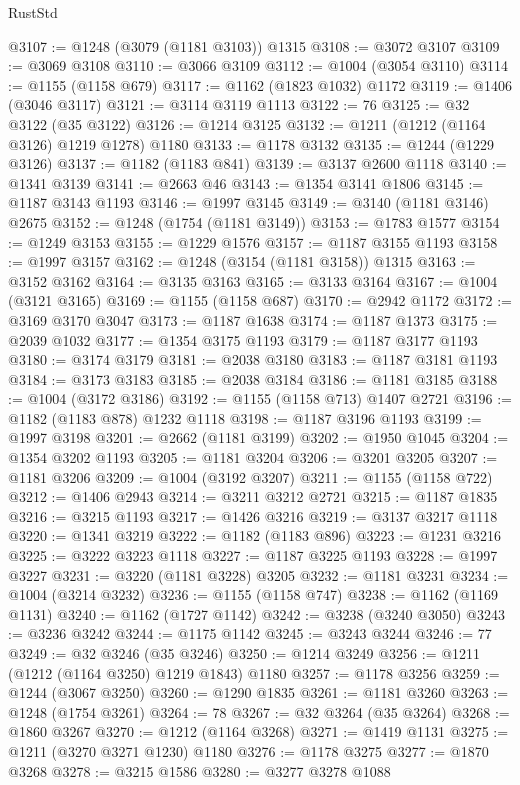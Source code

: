\begin{lexlean}{RustStd}
\begin{coremodule}
@3107 := @1248 (@3079 (@1181 @3103)) @1315
@3108 := @3072 @3107
@3109 := @3069 @3108
@3110 := @3066 @3109
@3112 := @1004 (@3054 @3110)
@3114 := @1155 (@1158 @679)
@3117 := @1162 (@1823 @1032) @1172
@3119 := @1406 (@3046 @3117)
@3121 := @3114 @3119 @1113
@3122 := 76
@3125 := @32 @3122 (@35 @3122)
@3126 := @1214 @3125
@3132 := @1211 (@1212 (@1164 @3126) @1219 @1278) @1180
@3133 := @1178 @3132
@3135 := @1244 (@1229 @3126)
@3137 := @1182 (@1183 @841)
@3139 := @3137 @2600 @1118
@3140 := @1341 @3139
@3141 := @2663 @46
@3143 := @1354 @3141 @1806
@3145 := @1187 @3143 @1193
@3146 := @1997 @3145
@3149 := @3140 (@1181 @3146) @2675
@3152 := @1248 (@1754 (@1181 @3149))
@3153 := @1783 @1577
@3154 := @1249 @3153
@3155 := @1229 @1576
@3157 := @1187 @3155 @1193
@3158 := @1997 @3157
@3162 := @1248 (@3154 (@1181 @3158)) @1315
@3163 := @3152 @3162
@3164 := @3135 @3163
@3165 := @3133 @3164
@3167 := @1004 (@3121 @3165)
@3169 := @1155 (@1158 @687)
@3170 := @2942 @1172
@3172 := @3169 @3170 @3047
@3173 := @1187 @1638
@3174 := @1187 @1373
@3175 := @2039 @1032
@3177 := @1354 @3175 @1193
@3179 := @1187 @3177 @1193
@3180 := @3174 @3179
@3181 := @2038 @3180
@3183 := @1187 @3181 @1193
@3184 := @3173 @3183
@3185 := @2038 @3184
@3186 := @1181 @3185
@3188 := @1004 (@3172 @3186)
@3192 := @1155 (@1158 @713) @1407 @2721
@3196 := @1182 (@1183 @878) @1232 @1118
@3198 := @1187 @3196 @1193
@3199 := @1997 @3198
@3201 := @2662 (@1181 @3199)
@3202 := @1950 @1045
@3204 := @1354 @3202 @1193
@3205 := @1181 @3204
@3206 := @3201 @3205
@3207 := @1181 @3206
@3209 := @1004 (@3192 @3207)
@3211 := @1155 (@1158 @722)
@3212 := @1406 @2943
@3214 := @3211 @3212 @2721
@3215 := @1187 @1835
@3216 := @3215 @1193
@3217 := @1426 @3216
@3219 := @3137 @3217 @1118
@3220 := @1341 @3219
@3222 := @1182 (@1183 @896)
@3223 := @1231 @3216
@3225 := @3222 @3223 @1118
@3227 := @1187 @3225 @1193
@3228 := @1997 @3227
@3231 := @3220 (@1181 @3228) @3205
@3232 := @1181 @3231
@3234 := @1004 (@3214 @3232)
@3236 := @1155 (@1158 @747)
@3238 := @1162 (@1169 @1131)
@3240 := @1162 (@1727 @1142)
@3242 := @3238 (@3240 @3050)
@3243 := @3236 @3242
@3244 := @1175 @1142
@3245 := @3243 @3244
@3246 := 77
@3249 := @32 @3246 (@35 @3246)
@3250 := @1214 @3249
@3256 := @1211 (@1212 (@1164 @3250) @1219 @1843) @1180
@3257 := @1178 @3256
@3259 := @1244 (@3067 @3250)
@3260 := @1290 @1835
@3261 := @1181 @3260
@3263 := @1248 (@1754 @3261)
@3264 := 78
@3267 := @32 @3264 (@35 @3264)
@3268 := @1860 @3267
@3270 := @1212 (@1164 @3268)
@3271 := @1419 @1131
@3275 := @1211 (@3270 @3271 @1230) @1180
@3276 := @1178 @3275
@3277 := @1870 @3268
@3278 := @3215 @1586
@3280 := @3277 @3278 @1088

\end{coremodule}
\end{lexlean}
